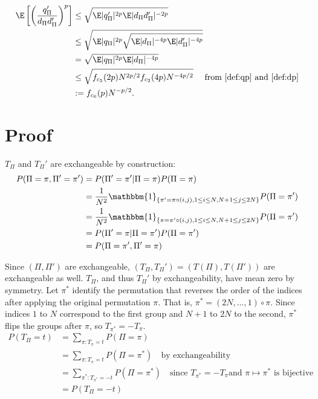 \begin{align}
  \E \left [ \left ( \frac{q_{\Pi}'}{d_{\Pi}d_{\Pi}'} \right )^p \right ]
  &\leq \sqrt{\E |q_{\Pi}'|^{2p} \E |d_{\Pi}d_{\Pi}'|^{-2p}} \nonumber \\
  &\leq \sqrt{\E |q_{\Pi}|^{2p} \sqrt{\E |d_{\Pi}|^{-4p} \E |d_{\Pi}'|^{-4p}}} \nonumber \\
  &= \sqrt{\E |q_{\Pi}|^{2p} \E |d_{\Pi}|^{-4p}} \nonumber \\ 
  &\leq \sqrt{f_{c_5}(2p) N^{2p/2} f_{c_2}(4p) N^{-4p/2}} \quad \text{ from
  } \eqref{def:qp} \text{ and } \eqref{def:dp} \nonumber \\
  &:= f_{c_6}(p) N^{-p/2} \label{def:qpddp}.
\end{align}

\section{Proof}
$T_{\Pi}$ and $T_{\Pi}'$ are exchangeable by construction:  
\begin{align*}
  P(\Pi = \pi, \Pi' = \pi') &= P(\Pi' = \pi' | \Pi = \pi)P(\Pi = \pi) \\
  &= \frac{1}{N^2}\mathbbm{1}_{\{\pi'=\pi \circ (i,j), 1\leq i \leq N, N+1 \leq j \leq 2N\}} P(\Pi =
  \pi') \\
  &=\frac{1}{N^2}\mathbbm{1}_{\{\pi=\pi' \circ (i,j), 1\leq i \leq N, N+1 \leq j \leq 2N\}} P(\Pi =
  \pi') \\
  &= P(\Pi' = \pi | \Pi = \pi')P(\Pi = \pi') \\
  &= P(\Pi = \pi', \Pi' = \pi)
\end{align*}

Since $(\Pi, \Pi')$ are exchangeable, $(T_{\Pi}, T_{\Pi}') = (T(\Pi), T(\Pi'))$ are exchangeable as
well.  $T_{\Pi}$, and thus $T_{\Pi}'$ by exchangeability, have mean zero by symmetry.  Let $\pi^*$ identify
the permutation that reverses the order of the indices after applying the original permutation
$\pi$.  That is, $\pi^* = (2N, \ldots, 1) \circ \pi$.  Since indices $1$ to $N$ correspond to the
first group and $N+1$ to $2N$ to the second, $\pi^*$ flips the groups after $\pi$, so $T_{\pi^*} =
-T_{\pi}$.
\begin{align*}
  P(T_{\Pi} = t) &= \sum_{\pi : T_{\pi} = t} P(\Pi = \pi) \\
  &= \sum_{\pi : T_{\pi} = t} P(\Pi = \pi^*) \quad \text{by exchangeability} \\
  &= \sum_{\pi^* : T_{\pi^*} = -t} P(\Pi = \pi^*) \quad \text{since } T_{\pi^*} = -T_{\pi} \text{
    and } \pi \mapsto \pi^* \text{ is bijective} \\
  &= P(T_{\Pi} = -t)
\end{align*}

